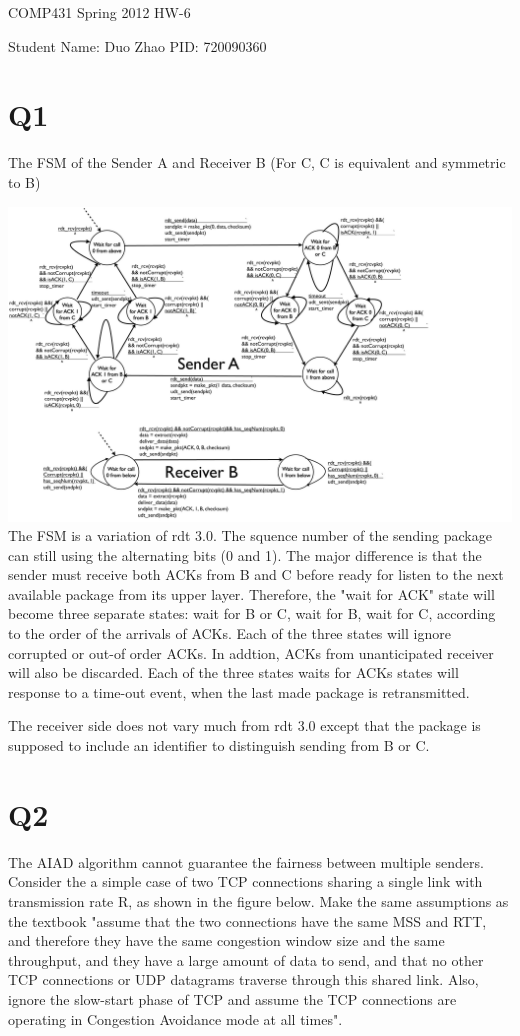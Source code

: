 \documentclass[a4paper, 11pt]{article}
\begin{document}
\centerline{\sc \large COMP431 Spring 2012 HW-6}
\vspace{.5pc}
\centerline{\sc Student Name: Duo Zhao  PID: 720090360}
\vspace{2pc}

\section{Q1}
The FSM of the Sender A and Receiver B (For C, C is equivalent
and symmetric to B)

\includegraphics[scale=0.36]{1001.pdf}
The FSM is a variation of rdt 3.0. The squence number of the sending package can
still using the alternating bits (0 and 1). The major difference is that the
sender must receive both ACKs from B and C before ready for listen to the next
available package from its upper layer. Therefore, the "wait for ACK" state will
become three separate states: wait for B or C, wait for B, wait for C, according
to the order of the arrivals of ACKs. Each of the three states will ignore
corrupted or out-of order ACKs. In addtion, ACKs from unanticipated receiver
will also be discarded. Each of the three states waits for ACKs states will
response to a time-out event, when the last made package is retransmitted. 

The receiver side does not vary much from rdt 3.0 except that the package is
supposed to include an identifier to distinguish sending from B or C. 

\pagebreak
\section{Q2}
The AIAD algorithm cannot guarantee the fairness between multiple senders.
Consider the a simple case of two TCP connections sharing a single link with
transmission rate R, as shown in the figure below. Make the same assumptions
as the textbook "assume that the two connections have the same MSS and RTT, and
therefore they have the same congestion window size and the same throughput, and
they have a large amount of data to send, and that no other TCP connections or
UDP datagrams traverse through this shared link. Also, ignore the slow-start
phase of TCP and assume the TCP connections are operating in Congestion
Avoidance mode at all times".
\end{document}
